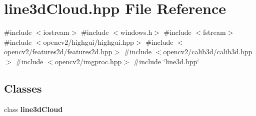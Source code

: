 \section{line3d\+Cloud.\+hpp File Reference}
\label{line3d_cloud_8hpp}
{\ttfamily \#include $<$iostream$>$}\newline
{\ttfamily \#include $<$windows.\+h$>$}\newline
{\ttfamily \#include $<$fstream$>$}\newline
{\ttfamily \#include $<$opencv2/highgui/highgui.\+hpp$>$}\newline
{\ttfamily \#include $<$opencv2/features2d/features2d.\+hpp$>$}\newline
{\ttfamily \#include $<$opencv2/calib3d/calib3d.\+hpp$>$}\newline
{\ttfamily \#include $<$opencv2/imgproc.\+hpp$>$}\newline
{\ttfamily \#include \char`\"{}line3d.\+hpp\char`\"{}}\newline
\subsection*{Classes}
\begin{DoxyCompactItemize}
\item 
class \textbf{ line3d\+Cloud}
\end{DoxyCompactItemize}
